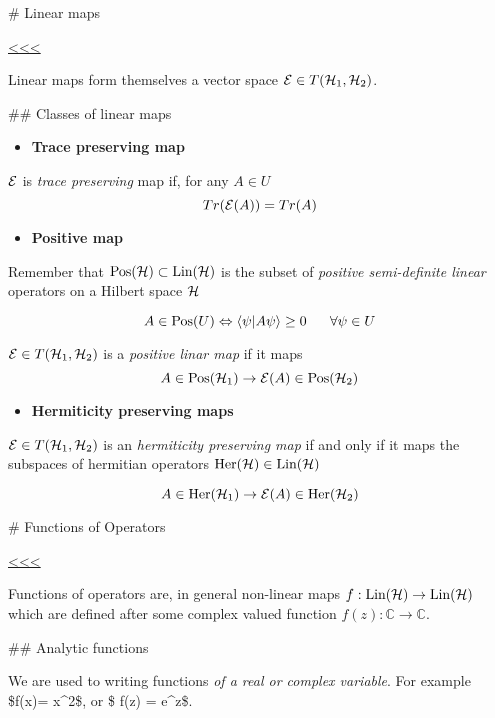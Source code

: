 \documentclass[11pt]{article}
\providecommand{\tightlist}{%
      \setlength{\itemsep}{0pt}\setlength{\parskip}{0pt}}
\begin{document}
    

    \# Linear maps

\hyperref[top]{<<<}

    Linear maps form themselves a vector space
\({\cal E} \in T({\cal H}_1,{\cal H}_2)\).

    

    \#\# Classes of linear maps

    \begin{itemize}
\tightlist
\item
  \textbf{Trace preserving map}
\end{itemize}

\({\cal E}\) is \emph{trace preserving} map if, for any \(A \in U\) \[
Tr({\cal E}(A)) = Tr(A) 
\]

    \begin{itemize}
\tightlist
\item
  \textbf{Positive map}
\end{itemize}

Remember that \(\hbox{Pos}({\cal H}) \subset \hbox{Lin}({\cal H})\) is the subset of
\emph{positive semi-definite linear} operators on a Hilbert space
\({\cal H}\)

\[
A \in \hbox{Pos}(U) \Leftrightarrow \langle \psi|A\psi\rangle\geq 0 ~~~~~ \forall{\psi}\in U
\]

\({\cal E}\in T({\cal H}_1,{\cal H}_2)\) is a \emph{positive linar map} if it
maps \[
 A\in \hbox{Pos}({\cal H}_1) \to {\cal E}(A) \in \hbox{Pos}({\cal H}_2)
\]

    \begin{itemize}
\tightlist
\item
  \textbf{Hermiticity preserving maps}
\end{itemize}

\({\cal E}\in T({\cal H}_1,{\cal H}_2)\) is an \emph{hermiticity preserving map}
if and only if it maps the subspaces of hermitian operators
\(\hbox{Her}({\cal H}) \in \hbox{Lin}({\cal H})\)

\[
 A\in \hbox{Her}({\cal H}_1) \to {\cal E}(A) \in \hbox{Her}({\cal H}_2)
\]

    \# Functions of Operators

\hyperref[top]{<<<}

    Functions of operators are, in general non-linear maps
\(f:\hbox{Lin}({\cal H})\to \hbox{Lin}({\cal H})\) which are defined after some complex
valued function \(f(z):{\mathbb C}\to {\mathbb C}\).

    \#\# Analytic functions

    We are used to writing functions \emph{of a real or complex variable}.
For example \$f(x)= x\^{}2\$, or \$ f(z) = e\^{}z\$.
\end{document}
